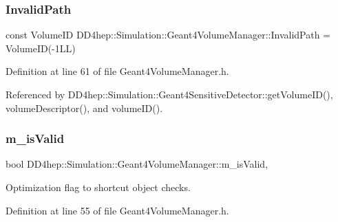 \hypertarget{class_d_d4hep_1_1_simulation_1_1_geant4_volume_manager_a7a52a387bf1165cc296e76eeda618e9c}{}\label{class_d_d4hep_1_1_simulation_1_1_geant4_volume_manager_a7a52a387bf1165cc296e76eeda618e9c} 
\subsubsection{\texorpdfstring{Invalid\+Path}{InvalidPath}}
{\footnotesize\ttfamily const Volume\+ID D\+D4hep\+::\+Simulation\+::\+Geant4\+Volume\+Manager\+::\+Invalid\+Path = Volume\+ID(-\/1\+L\+L)\hspace{0.3cm}{\ttfamily [static]}}



Definition at line 61 of file Geant4\+Volume\+Manager.\+h.



Referenced by D\+D4hep\+::\+Simulation\+::\+Geant4\+Sensitive\+Detector\+::get\+Volume\+I\+D(), volume\+Descriptor(), and volume\+I\+D().

\hypertarget{class_d_d4hep_1_1_simulation_1_1_geant4_volume_manager_abbc8ba6689ff382f2803382ccaf3d6d6}{}\label{class_d_d4hep_1_1_simulation_1_1_geant4_volume_manager_abbc8ba6689ff382f2803382ccaf3d6d6} 
\subsubsection{\texorpdfstring{m\+\_\+is\+Valid}{m\_isValid}}
{\footnotesize\ttfamily bool D\+D4hep\+::\+Simulation\+::\+Geant4\+Volume\+Manager\+::m\+\_\+is\+Valid\hspace{0.3cm}{\ttfamily [mutable]}, {\ttfamily [protected]}}



Optimization flag to shortcut object checks. 



Definition at line 55 of file Geant4\+Volume\+Manager.\+h.



